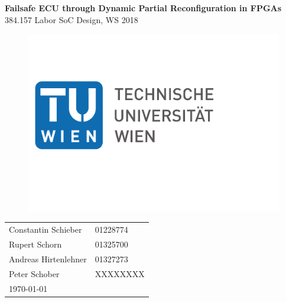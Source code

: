 \begin{titlepage}

\begin{doublespace} 
\begin{center}
    \vspace*{35mm}
    {\LARGE\textbf{Failsafe ECU through Dynamic Partial Reconfiguration in FPGAs}}\\
    \vspace*{5mm}
    {\large 384.157 Labor SoC Design, WS 2018}
    \vspace*{20mm}
\end{center}
\end{doublespace}

\begin{figure}[H]
    \begin{center}
    	\includegraphics[scale=0.3]{./figures/TU_logo.pdf}
	    \label{fig:logo}
    \end{center}
\end{figure}

\vfill

\begin{tabular}{ll} 
    Constantin Schieber & 01228774\\[1mm]
    Rupert Schorn & 01325700\\[1mm]
    Andreas Hirtenlehner & 01327273\\[1mm]
    Peter Schober & XXXXXXXX\\[5mm]
    \multicolumn{2}{l}{\today} 
\end{tabular}

\end{titlepage}
